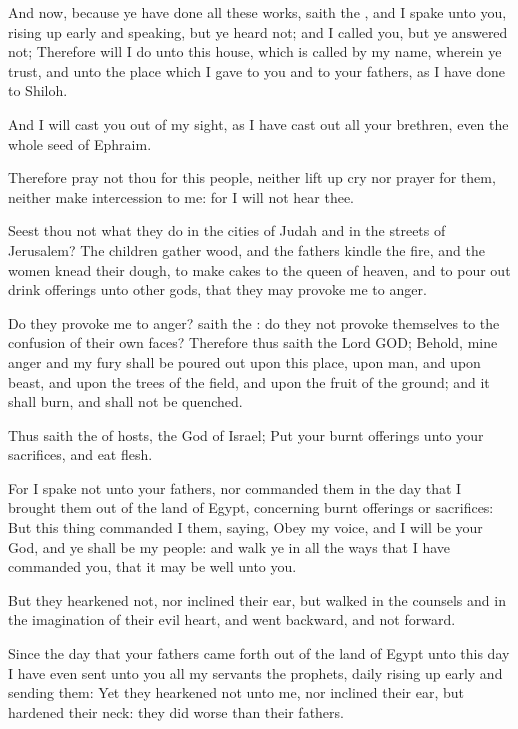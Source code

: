 \Verse And now, because ye have done all these works, saith the \LORD, and I spake unto you, rising up early and speaking, but ye heard not; and I called you, but ye answered not; \Verse Therefore will I do unto this house, which is called by my name, wherein ye trust, and unto the place which I gave to you and to your fathers, as I have done to Shiloh.

\Verse And I will cast you out of my sight, as I have cast out all your brethren, even the whole seed of Ephraim.

\Verse Therefore pray not thou for this people, neither lift up cry nor prayer for them, neither make intercession to me: for I will not hear thee.

\Verse Seest thou not what they do in the cities of Judah and in the streets of Jerusalem?  \Verse The children gather wood, and the fathers kindle the fire, and the women knead their dough, to make cakes to the queen of heaven, and to pour out drink offerings unto other gods, that they may provoke me to anger.

\Verse Do they provoke me to anger? saith the \LORD: do they not provoke themselves to the confusion of their own faces?  \Verse Therefore thus saith the Lord GOD; Behold, mine anger and my fury shall be poured out upon this place, upon man, and upon beast, and upon the trees of the field, and upon the fruit of the ground; and it shall burn, and shall not be quenched.

\Verse Thus saith the \LORD of hosts, the God of Israel; Put your burnt offerings unto your sacrifices, and eat flesh.

\Verse For I spake not unto your fathers, nor commanded them in the day that I brought them out of the land of Egypt, concerning burnt offerings or sacrifices: \Verse But this thing commanded I them, saying, Obey my voice, and I will be your God, and ye shall be my people: and walk ye in all the ways that I have commanded you, that it may be well unto you.

\Verse But they hearkened not, nor inclined their ear, but walked in the counsels and in the imagination of their evil heart, and went backward, and not forward.

\Verse Since the day that your fathers came forth out of the land of Egypt unto this day I have even sent unto you all my servants the prophets, daily rising up early and sending them: \Verse Yet they hearkened not unto me, nor inclined their ear, but hardened their neck: they did worse than their fathers.


